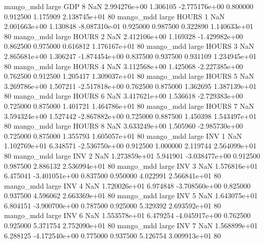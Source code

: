         mango_mdd      large      GDP                 8                  NaN 2.994276e+00      1.306105 -2.775176e+00 0.800000 0.912500       1.175909 2.138745e+01 80
        mango_mdd      large    HOURS                 1                  NaN 2.001663e+00      1.130848 -8.087310e-01 0.925000 0.987500       0.322890 1.140633e+01 80
        mango_mdd      large    HOURS                 2                  NaN 2.412106e+00      1.169328 -1.429982e+00 0.862500 0.975000       0.616812 1.176167e+01 80
        mango_mdd      large    HOURS                 3                  NaN 2.865681e+00      1.306247 -1.874454e+00 0.837500 0.937500       0.931109 1.234945e+01 80
        mango_mdd      large    HOURS                 4                  NaN 3.112568e+00      1.425068 -2.227385e+00 0.762500 0.912500       1.205417 1.309037e+01 80
        mango_mdd      large    HOURS                 5                  NaN 3.269786e+00      1.507211 -2.517818e+00 0.762500 0.875000       1.362695 1.387139e+01 80
        mango_mdd      large    HOURS                 6                  NaN 3.417621e+00      1.536618 -2.729383e+00 0.725000 0.875000       1.401721 1.464786e+01 80
        mango_mdd      large    HOURS                 7                  NaN 3.594324e+00      1.527442 -2.867882e+00 0.725000 0.887500       1.450398 1.543497e+01 80
        mango_mdd      large    HOURS                 8                  NaN 3.633249e+00      1.505960 -2.985730e+00 0.725000 0.875000       1.355793 1.605057e+01 80
        mango_mdd      large      INV                 1                  NaN 1.102769e+01      6.348571 -2.536750e+00 0.912500 1.000000       2.119744 2.564099e+01 80
        mango_mdd      large      INV                 2                  NaN 1.273859e+01      5.941901 -3.038477e+00 0.912500 0.987500       2.886132 2.536994e+01 80
        mango_mdd      large      INV                 3                  NaN 1.576816e+01      6.475041 -3.401051e+00 0.837500 0.950000       4.022991 2.566841e+01 80
        mango_mdd      large      INV                 4                  NaN 1.720026e+01      6.974848 -3.708560e+00 0.825000 0.937500       4.596062 2.663369e+01 80
        mango_mdd      large      INV                 5                  NaN 1.643075e+01      6.804151 -3.900700e+00 0.787500 0.925000       5.329392 2.693592e+01 80
        mango_mdd      large      INV                 6                  NaN 1.553578e+01      6.479254 -4.045917e+00 0.762500 0.925000       5.371754 2.752090e+01 80
        mango_mdd      large      INV                 7                  NaN 1.568899e+01      6.288125 -4.172540e+00 0.775000 0.937500       5.126754 3.009913e+01 80

